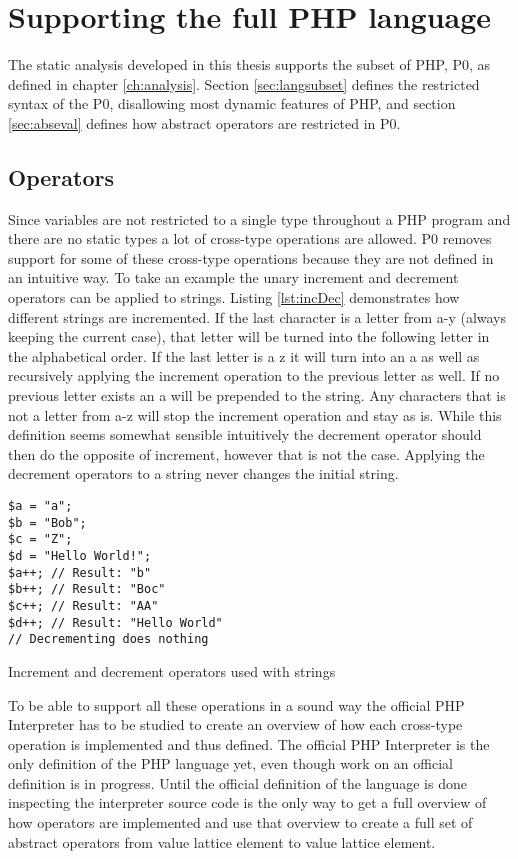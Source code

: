\section{Supporting the full PHP language}
The static analysis developed in this thesis supports the subset of PHP, P0, as defined in chapter \ref{ch:analysis}.
Section \ref{sec:langsubset} defines the restricted syntax of the P0, disallowing most dynamic features of PHP, and section \ref{sec:abseval} defines how abstract operators are restricted in P0. 

\subsection{Operators}
Since variables are not restricted to a single type throughout a PHP program and there are no static types a lot of cross-type operations are allowed. P0 removes support for some of these cross-type operations because they are not defined in an intuitive way. To take an example the unary increment and decrement operators can be applied to strings. Listing \ref{lst:incDec} demonstrates how different strings are incremented. If the last character is a letter from a-y (always keeping the current case), that letter will be turned into the following letter in the alphabetical order. If the last letter is a z it will turn into an a as well as recursively applying the increment operation to the previous letter as well. If no previous letter exists an a will be prepended to the string. Any characters that is not a letter from a-z will stop the increment operation and stay as is. While this definition seems somewhat sensible intuitively the decrement operator should then do the opposite of increment, however that is not the case. Applying the decrement operators to a string never changes the initial string.

\begin{program}
\begin{lstlisting}
$a = "a";
$b = "Bob";
$c = "Z";
$d = "Hello World!";
$a++; // Result: "b"
$b++; // Result: "Boc"
$c++; // Result: "AA"
$d++; // Result: "Hello World"
// Decrementing does nothing
\end{lstlisting}
\caption{Increment and decrement operators used with strings}
\label{lst:incDec}
\end{program}

To be able to support all these operations in a sound way the official PHP Interpreter has to be studied to create an overview of how each cross-type operation is implemented and thus defined. The official PHP Interpreter is the only definition of the PHP language yet, even though work on an official definition is in progress. Until the official definition of the language is done inspecting the interpreter source code is the only way to get a full overview of how operators are implemented and use that overview to create a full set of abstract operators from value lattice element to value lattice element.

